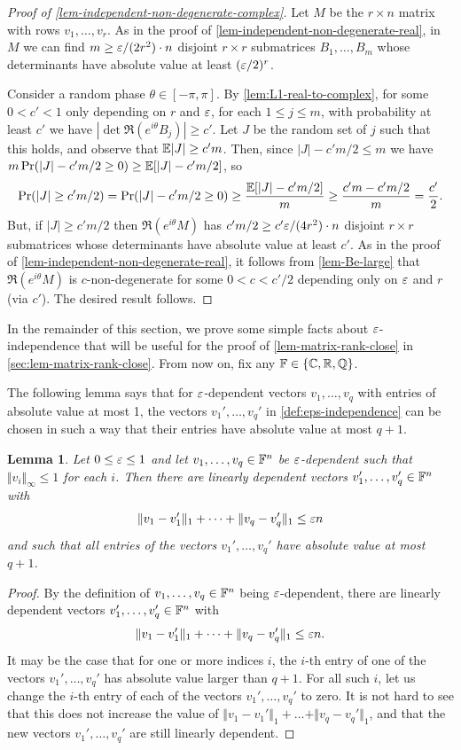 \documentclass{daj}
\theoremstyle{plain}
\theoremstyle{plain}
\newtheorem{lem}[thm]{Lemma}
\theoremstyle{plain}
\theoremstyle{plain}
\theoremstyle{definition}
\theoremstyle{plain}
\theoremstyle{plain}
\theoremstyle{definition}
\theoremstyle{definition}
\theoremstyle{plain}
\begin{document}
\begin{proof}[Proof of \cref{lem-independent-non-degenerate-complex}]
Let $M$ be the $r\times n$ matrix with rows $v_1,\dots,v_r$. As in the proof of \cref{lem-independent-non-degenerate-real}, in $M$ we can find $m\geq \varepsilon/(2r^2)\cdot n$ disjoint $r\times r$ submatrices $B_1,\dots, B_m$ whose determinants have absolute value at least $(\varepsilon/2)^r$.

Consider a random phase $\theta\in [-\pi, \pi]$. By \cref{lem:L1-real-to-complex}, for some $0<c'<1$ only depending on $r$ and $\varepsilon$, for each $1\le j\le m$, with probability at least $c'$ we have $|\det \Re(e^{i\theta}B_j)|\ge c'$. Let $J$ be the random set of $j$ such that this holds, and observe that $\mathbb{E} |J|\ge c'm$. Then, since $|J|-c'm/2\le m$ we have $m\Pr(|J|-c'm/2\ge 0)\ge \mathbb{E}[|J|-c'm/2]$, so
\[
\Pr(|J|\ge c'm/2)=\Pr(|J|-c'm/2\geq 0)\ge \frac{\mathbb{E}[|J|-c'm/2]}{m}\geq \frac{c'm-c'm/2}{m}=\frac{c'}{2}.
\]
But, if $|J|\ge c'm/2$ then $\Re(e^{i\theta}M)$ has $c'm/2\geq c'\varepsilon/(4r^2)\cdot n$ disjoint $r\times r$ submatrices whose determinants have absolute value at least $c'$. As in the proof of \cref{lem-independent-non-degenerate-real}, it follows from \cref{lem-Be-large} that $\Re(e^{i\theta}M)$ is $c$-non-degenerate for some $0<c<c'/2$ depending only on $\varepsilon$ and $r$ (via $c'$). The desired result follows.
\end{proof}

In the remainder of this section, we prove some simple facts about $\varepsilon$-independence that will be useful for the proof of \cref{lem-matrix-rank-close} in \cref{sec:lem-matrix-rank-close}. From now on, fix any $\mathbb{F}\in \lbrace \mathbb{C}, \mathbb{R}, \mathbb{Q}\rbrace$.

The following lemma says that for $\varepsilon$-dependent vectors $v_1,\dots,v_q$ with entries of absolute value at most 1, the vectors $v_1',\dots,v_q'$ in \cref{def:eps-independence} can be chosen in such a way that their entries have absolute value at most $q+1$.

\begin{lem}\label{lem-eps-dependent-change-bounded}
Let $0\leq \varepsilon\leq 1$ and let $v_1,\dots,v_q\in \mathbb{F}^n$ be $\varepsilon$-dependent such that $\Vert v_i\Vert_\infty\le 1$ for each $i$. Then there are linearly dependent vectors $v_1',\dots,v_q'\in \mathbb{F}^n$ with
\[\Vert v_1-v_1'\Vert_1+\dots +\Vert v_q-v_q'\Vert_1\leq \varepsilon n\]
and such that all entries of the vectors $v_1',\dots,v_q'$ have absolute value at most $q+1$.
\end{lem}
\begin{proof}
By the definition of $v_1,\dots,v_q\in \mathbb{F}^n$ being $\varepsilon$-dependent, there are linearly dependent vectors $v_1',\dots,v_q'\in \mathbb{F}^n$ with
\[\Vert v_1-v_1'\Vert_1+\dots +\Vert v_q-v_q'\Vert_1\leq \varepsilon n.\]
It may be the case that for one or more indices $i$, the $i$-th entry of one of the vectors $v_1',\dots,v_q'$ has absolute value larger than $q+1$. For all such $i$, let us change the $i$-th entry of each of the vectors $v_1',\dots,v_q'$ to zero. It is not hard to see that this does not increase the value of $\Vert v_1-v_1'\Vert_1+\dots +\Vert v_q-v_q'\Vert_1$, and that the new vectors $v_1',\dots,v_q'$ are still linearly dependent.
\end{proof}
\end{document}
